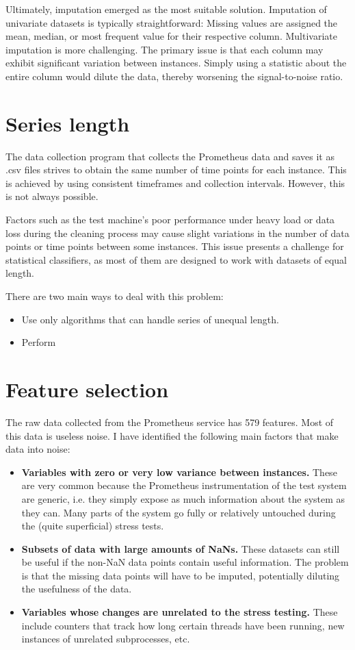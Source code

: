 Ultimately, imputation emerged as the most suitable solution. Imputation of univariate datasets is typically straightforward: Missing values are assigned the mean, median, or most frequent value for their respective column. Multivariate imputation is more challenging. The primary issue is that each column may exhibit significant variation between instances. Simply using a statistic about the entire column would dilute the data, thereby worsening the signal-to-noise ratio.
\section{Series length}
The data collection program that collects the Prometheus data and saves it as .csv files strives to obtain the same number of time points for each instance. This is achieved by using consistent timeframes and collection intervals. However, this is not always possible.

Factors such as the test machine's poor performance under heavy load or data loss during the cleaning process may cause slight variations in the number of data points or time points between some instances. This issue presents a challenge for statistical classifiers, as most of them are designed to work with datasets of equal length.

There are two main ways to deal with this problem:
\begin{itemize}
    \item Use only algorithms that can handle series of unequal length.
    \item Perform
\end{itemize}

\section{Feature selection}
The raw data collected from the Prometheus service has 579 features. Most of this data is useless noise. I have identified the following main factors that make data into noise:

\begin{itemize}
    \item \textbf{Variables with zero or very low variance between instances.} These are very common because the Prometheus instrumentation of the test system are generic, i.e. they simply expose as much information about the system as they can. Many parts of the system go fully or relatively untouched during the (quite superficial) stress tests.
    \item \textbf{Subsets of data with large amounts of NaNs.} These datasets can still be useful if the non-NaN data points contain useful information. The problem is that the missing data points will have to be imputed, potentially diluting the usefulness of the data.
    \item \textbf{Variables whose changes are unrelated to the stress testing.} These include counters that track how long certain threads have been running, new instances of unrelated subprocesses, etc.
\end{itemize}

